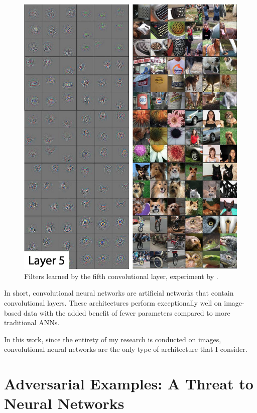 \begin{figure}[htp]
    \includegraphics[clip,width=1\columnwidth]{Figures/related/kernels_5.png}
    \caption{ Filters learned by the fifth convolutional layer, experiment by
        \cite{zeiler_visualizing_2013}. }
    \label{fig:kernels_5}
\end{figure}

In short, convolutional neural networks are artificial networks that contain
convolutional layers. These architectures perform exceptionally well on
image-based data with the added benefit of fewer parameters compared to more
traditional ANNs.


In this work, since the entirety of my research is conducted on images,
convolutional neural networks are the only type of architecture that I consider.

\section{Adversarial Examples: A Threat to Neural Networks}
\label{Adversarial_examples}

